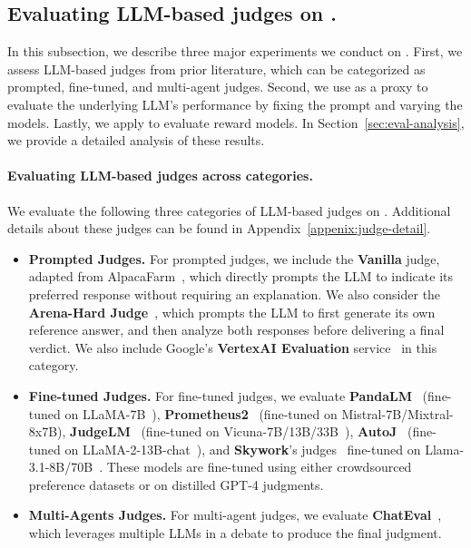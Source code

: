 \documentclass{article} %
\begin{document}
\subsection{Evaluating LLM-based judges on \sys.}
In this subsection, we describe three major experiments we conduct on \sys. First, we assess LLM-based judges from prior literature, which can be categorized as prompted, fine-tuned, and multi-agent judges. Second, we use \sys as a proxy to evaluate the underlying LLM's performance by fixing the prompt and varying the models. Lastly, we apply \sys to evaluate reward models. In Section~\ref{sec:eval-analysis}, we provide a detailed analysis of these results.

\paragraph{Evaluating LLM-based judges across categories.} We evaluate the following three categories of LLM-based judges on \sys. Additional details about these judges can be found in Appendix~\ref{appenix:judge-detail}.
\begin{itemize}
    \item \textbf{Prompted Judges.} For prompted judges, we include the \textbf{Vanilla} judge, adapted from AlpacaFarm~\citep{dubois2024alpacafarm}, which directly prompts the LLM to indicate its preferred response without requiring an explanation. We also consider the \textbf{Arena-Hard Judge}~\citep{li2024arenahard}, which prompts the LLM to first generate its own reference answer, and then analyze both responses before delivering a final verdict. We also include Google's \textbf{VertexAI Evaluation} service~\citep{vertexjudge2024} in this category.
    \item \textbf{Fine-tuned Judges.} For fine-tuned judges, we evaluate \textbf{PandaLM}~\citep{wang2023pandalm} (fine-tuned on LLaMA-7B~\citep{touvron2023llama}), \textbf{Prometheus2}~\citep{kim2024prometheus2} (fine-tuned on Mistral-7B/Mixtral-8x7B), \textbf{JudgeLM}~\citep{zhu2023judgelm} (fine-tuned on Vicuna-7B/13B/33B~\citep{vicuna2023}), \textbf{AutoJ}~\citep{li2023autoj} (fine-tuned on LLaMA-2-13B-chat~\citep{touvron2023llama2}), and \textbf{Skywork}'s judges~\citep{skyworkcritic2024} fine-tuned on Llama-3.1-8B/70B~\citep{dubey2024llama3}. These models are fine-tuned using either crowdsourced preference datasets or on distilled GPT-4 judgments.
    \item \textbf{Multi-Agents Judges.} For multi-agent judges, we evaluate \textbf{ChatEval}~\citep{chan2023chateval}, which leverages multiple LLMs in a debate to produce the final judgment.
\end{itemize}
\end{document}

